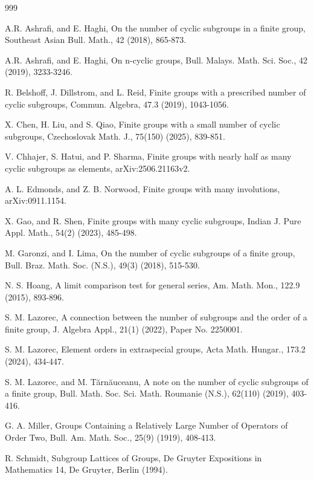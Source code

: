 \documentclass[a4paper,11pt]{amsart}
\numberwithin{equation}{section}
\numberwithin{equation}{subsection}
\begin{document}
\begin{thebibliography}{999}







A.R. Ashrafi, and E. Haghi, On the number of cyclic subgroups in a finite group, Southeast Asian Bull. Math., 42 (2018), 865-873.

A.R. Ashrafi, and E. Haghi, On n-cyclic groups, Bull. Malays. Math. Sci. Soc., 42 (2019), 3233-3246.

R. Belshoff, J. Dillstrom, and L. Reid, Finite groups with a prescribed number of cyclic subgroups, Commun. Algebra, 47.3 (2019), 1043-1056.

X. Chen, H. Liu, and S. Qiao, Finite groups with a small number of cyclic subgroups, Czechoslovak Math. J., 75(150) (2025), 839-851.

V. Chhajer, S. Hatui, and P. Sharma, Finite groups with nearly half as many cyclic subgroups as elements, arXiv:2506.21163v2.

A. L. Edmonds, and Z. B. Norwood, Finite groups with many involutions, arXiv:0911.1154.

X. Gao, and R. Shen, Finite groups with many cyclic subgroups, Indian J. Pure Appl. Math., 54(2) (2023), 485-498.

M. Garonzi, and I. Lima, On the number of cyclic subgroups of a finite group, Bull. Braz. Math. Soc. (N.S.), 49(3) (2018), 515-530.

N. S. Hoang, A limit comparison test for general series, Am. Math. Mon., 122.9 (2015), 893-896.

S. M. Lazorec, A connection between the number of subgroups and the order of a finite group, J. Algebra Appl., 21(1) (2022), Paper No. 2250001.

S. M. Lazorec, Element orders in extraspecial groups, Acta Math. Hungar., 173.2 (2024), 434-447.

S. M. Lazorec, and M. Tărnăuceanu, A note on the number of cyclic subgroups of a finite group, Bull. Math. Soc. Sci. Math. Roumanie (N.S.), 62(110) (2019), 403-416.

G. A. Miller, Groups Containing a Relatively Large Number of Operators of Order Two, Bull. Am. Math. Soc., 25(9) (1919), 408-413.

R. Schmidt, Subgroup Lattices of Groups, De Gruyter Expositions in Mathematics 14, De Gruyter, Berlin (1994).


\end{thebibliography}
\end{document}
